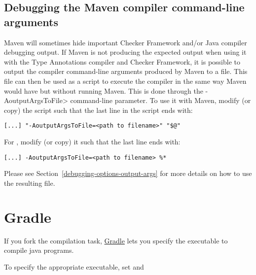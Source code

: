 

\subsection{Debugging the Maven compiler command-line arguments\label{debugging-maven-args}}

Maven will sometimes hide important Checker Framework and/or Java compiler debugging output.
If Maven is not producing the expected output when using it with the Type Annotations compiler
and Checker Framework, it is possible to output the compiler command-line arguments produced
by Maven to a file.  This file can then be used as a script to execute the compiler in the
same way Maven would have but without running Maven.  This is done through the
\<-AoutputArgsToFile> command-line parameter.  To use it with Maven, modify (or copy) the
 script such that the last line in the script ends with:

\begin{verbatim}
[...] "-AoutputArgsToFile=<path to filename>" "$@"
\end{verbatim}

For , modify (or copy) it such that the last line ends with:

\begin{verbatim}
[...] -AoutputArgsToFile=<path to filename> %*
\end{verbatim}

Please see Section~\ref{debugging-options-output-args} for more details on how to use
the resulting file.



\section{Gradle\label{gradle}}


If you fork the compilation task, \href{http://gradle.org/}{Gradle}
lets you specify the executable to compile java programs.

To specify the appropriate executable, set
 and

